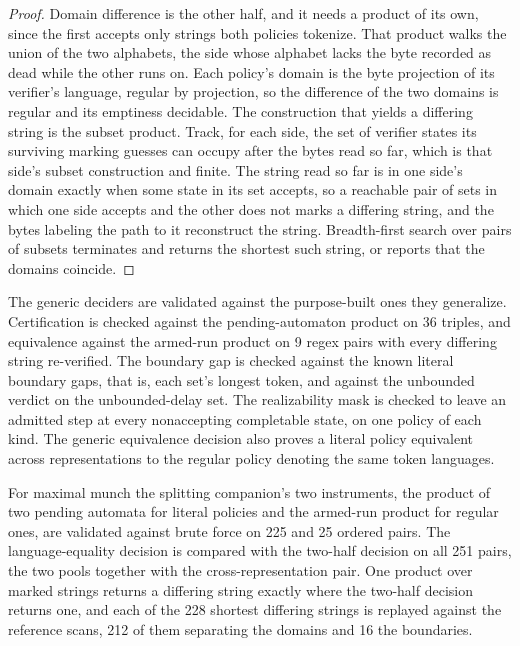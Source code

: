 \documentclass[11pt,a4paper]{article}
\theoremstyle{definition}
\theoremstyle{plain}
\begin{document}
\begin{proof}
Domain difference is the other half, and it needs a product of its own, since the first accepts only strings both
policies tokenize. That product walks the union of the two alphabets, the side whose alphabet lacks the byte recorded as
dead while the other runs on. Each policy's domain is the byte projection of its verifier's language, regular by
projection, so the difference of the two domains is regular and its emptiness decidable. The construction that yields a
differing string is the subset product. Track, for each side, the set of verifier states its surviving marking guesses
can occupy after the bytes read so far, which is that side's subset construction and finite. The string read so far is
in one side's domain exactly when some state in its set accepts, so a reachable pair of sets in which one side accepts
and the other does not marks a differing string, and the bytes labeling the path to it reconstruct the string.
Breadth-first search over pairs of subsets terminates and returns the shortest such string, or reports that the domains
coincide.
\end{proof}

The generic deciders are validated against the purpose-built ones they generalize. Certification is checked against the
pending-automaton product on 36 triples, and equivalence against the armed-run product on 9 regex pairs with every
differing string re-verified. The boundary gap is checked against the known literal boundary gaps, that is, each set's
longest token, and against the unbounded verdict on the unbounded-delay set. The realizability mask is checked to leave
an admitted step at every nonaccepting completable state, on one policy of each kind. The generic equivalence decision
also proves a literal policy equivalent across representations to the regular policy denoting the same token languages.

For maximal munch the splitting companion's two instruments, the product of two pending automata for literal policies
and the armed-run product for regular ones, are validated against brute force on 225 and 25 ordered pairs. The
language-equality decision is compared with the two-half decision on all 251 pairs, the two pools together with the
cross-representation pair. One product over marked strings returns a differing string exactly where the two-half
decision returns one, and each of the 228 shortest differing strings is replayed against the reference scans, 212 of
them separating the domains and 16 the boundaries.
\end{document}
